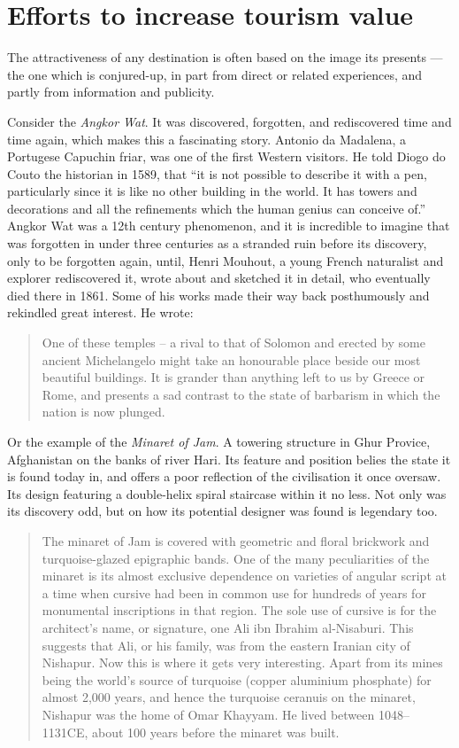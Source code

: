 \section{Efforts to increase tourism value} %
\label{sec:ettv}

The attractiveness of any destination is often based on the image its presents --- the one which is conjured-up, in part from direct or related experiences, and partly from information and publicity. 

Consider the \emph{Angkor Wat}. It was discovered, forgotten, and rediscovered time and time again, which makes this a fascinating story. Antonio da Madalena, a Portugese Capuchin friar, was one of the first Western visitors. He told Diogo do Couto the historian in 1589, that ``it is not possible to describe it with a pen, particularly since it is like no other building in the world. It has towers and decorations and all the refinements which the human genius can conceive of.'' Angkor Wat was a 12th century phenomenon, and it is incredible to imagine that was forgotten in under three centuries as a stranded ruin before its discovery, only to be forgotten again, until, Henri Mouhout, a young French naturalist and explorer rediscovered it, wrote about and sketched it in detail, who eventually died there in 1861. Some of his works made their way back posthumously and rekindled great interest. He wrote:

\begin{quote}
  One of these temples -- a rival to that of Solomon and erected by some ancient Michelangelo might take an honourable place beside our most beautiful buildings. It is grander than anything left to us by Greece or Rome, and presents a sad contrast to the state of barbarism in which the nation is now plunged.
\end{quote}

\noindent Or the example of the \emph{Minaret of Jam}. A towering structure in Ghur Provice, Afghanistan on the banks of river Hari. Its feature and position belies the state it is found today in, and offers a poor reflection of the civilisation it once oversaw. Its design featuring a double-helix spiral staircase within it no less. Not only was its discovery odd, but on how its potential designer was found is legendary too.

\begin{quote}
  The minaret of Jam is covered with geometric and floral brickwork and turquoise-glazed epigraphic bands. One of the many peculiarities of the minaret is its almost exclusive dependence on varieties of angular script at a time when cursive had been in common use for hundreds of years for monumental inscriptions in that region. The sole use of cursive is for the architect's name, or signature, one Ali ibn Ibrahim al-Nisaburi. This suggests that Ali, or his family, was from the eastern Iranian city of Nishapur. Now this is where it gets very interesting. Apart from its mines being the world's source of turquoise (copper aluminium phosphate) for almost 2,000 years, and hence the turquoise ceranuis on the minaret, Nishapur was the home of Omar Khayyam. He lived between 1048--1131CE, about 100 years before the minaret was built.
\end{quote}

